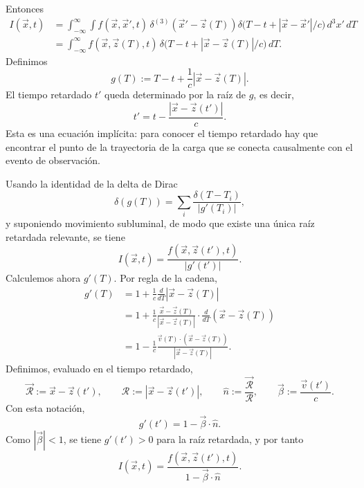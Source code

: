 \documentclass[12pt,a4paper]{article}
\theoremstyle{definition}
\theoremstyle{plain}
\numberwithin{equation}{section}
\theoremstyle{remark}
\begin{document}
Entonces
\begin{align}
    I(\vec x,t)
    &=\int_{-\infty}^{\infty}\int
    f(\vec x,\vec x',t)\,
    \delta^{(3)}(\vec x'-\vec z(T))
    \delta\!\bigl(T-t+|\vec x-\vec x'|/c\bigr)
    \,d^3x'\,dT \\
    &=\int_{-\infty}^{\infty}
    f(\vec x,\vec z(T),t)\,
    \delta\!\bigl(T-t+|\vec x-\vec z(T)|/c\bigr)\,dT.
    \label{eq:rad-lw-integral-sobre-T}
\end{align}
Definimos
\begin{equation}
    g(T):=T-t+\frac{1}{c}|\vec x-\vec z(T)|.
    \label{eq:rad-lw-gT}
\end{equation}
El tiempo retardado $t'$ queda determinado por la raíz de $g$, es decir,
\begin{equation}
    \boxed{
    t'=t-\frac{|\vec x-\vec z(t')|}{c}.
    }
    \label{eq:rad-lw-tiempo-retardado}
\end{equation}
Esta es una ecuación implícita: para conocer el tiempo retardado hay que encontrar el punto de la trayectoria de la carga que se conecta causalmente con el evento de observación.

Usando la identidad de la delta de Dirac
\begin{equation*}
    \delta(g(T))=\sum_i\frac{\delta(T-T_i)}{|g'(T_i)|},
\end{equation*}
y suponiendo movimiento subluminal, de modo que existe una única raíz retardada relevante, se tiene
\begin{equation}
    I(\vec x,t)=
    \frac{f(\vec x,\vec z(t'),t)}{|g'(t')|}.
    \label{eq:rad-lw-I-con-gprima}
\end{equation}
Calculemos ahora $g'(T)$. Por regla de la cadena,
\begin{align}
    g'(T)
    &=1+\frac{1}{c}\frac{d}{dT}|\vec x-\vec z(T)| \\
    &=1+\frac{1}{c}\frac{\vec x-\vec z(T)}{|\vec x-\vec z(T)|}\cdot\frac{d}{dT}(\vec x-\vec z(T)) \\
    &=1-\frac{1}{c}\frac{\vec v(T)\cdot(\vec x-\vec z(T))}{|\vec x-\vec z(T)|}.
    \label{eq:rad-lw-gprima-calculo}
\end{align}
Definimos, evaluado en el tiempo retardado,
\begin{equation}
    \vec{\mathcal R}:=\vec x-\vec z(t'),
    \qquad
    \mathcal R:=|\vec x-\vec z(t')|,
    \qquad
    \hat n:=\frac{\vec{\mathcal R}}{\mathcal R},
    \qquad
    \vec\beta:=\frac{\vec v(t')}{c}.
    \label{eq:rad-lw-definiciones-retardadas}
\end{equation}
Con esta notación,
\begin{equation}
    g'(t')=1-\vec\beta\cdot\hat n.
    \label{eq:rad-lw-gprima-final}
\end{equation}
Como $|\vec\beta|<1$, se tiene $g'(t')>0$ para la raíz retardada, y por tanto
\begin{equation}
    I(\vec x,t)=
    \frac{f(\vec x,\vec z(t'),t)}{1-\vec\beta\cdot\hat n}.
    \label{eq:rad-lw-I-final}
\end{equation}
\end{document}
